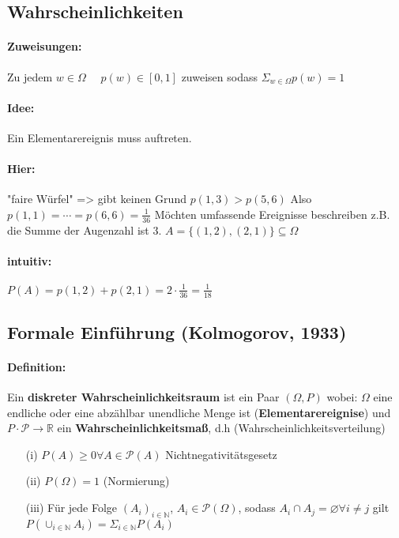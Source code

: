 \documentclass{article}
\begin{document}
\subsection*{Wahrscheinlichkeiten}
\paragraph*{Zuweisungen:} Zu jedem \(w \in \Omega \quad\) \(p(w) \in [0, 1]\) zuweisen sodass \(\Sigma_{w \in \Omega} p(w) = 1\)
\paragraph*{Idee:} Ein Elementarereignis muss auftreten.
\paragraph*{Hier:} "faire Würfel" => gibt keinen Grund \(p(1,3) > p(5,6)\) 
Also \(p(1,1) = \cdots = p(6,6) = \frac{1}{36}\)
Möchten umfassende Ereignisse beschreiben z.B. die Summe der Augenzahl ist 3.
\(A =\{(1,2), (2,1)\} \subseteq \Omega\)
\paragraph*{intuitiv:} \(P(A) = p(1,2) + p(2,1) = 2 \cdot \frac{1}{36} = \frac{1}{18}\)

\subsection*{Formale Einführung (Kolmogorov, 1933)}
\paragraph*{Definition:} Ein \textbf{diskreter Wahrscheinlichkeitsraum} ist ein Paar \((\Omega, P)\) wobei: \(\Omega\) eine endliche oder eine abzählbar unendliche Menge ist (\textbf{Elementarereignise}) und \(P \cdot \mathcal{P} \rightarrow\mathbb{R}\) ein \textbf{Wahrscheinlichkeitsmaß}, d.h (Wahrscheinlichkeitsverteilung)
\begin{itemize}
    \item [(i)] \(P(A) \geq 0 \forall A \in \mathcal{P}(A)\) Nichtnegativitätsgesetz
    \item [(ii)] \(P(\Omega) = 1\) (Normierung)
    \item  [(iii)] Für jede Folge \((A_i)_{i \in \mathbb{N}}\), \(A_i \in \mathcal{P}(\Omega)\), sodass \(A_i \cap A_j = \varnothing \forall i \not = j\) gilt \(P(\cup_{i \in \mathbb{N}} A_i) = \Sigma_{i \in \mathbb{N}} P(A_i)\)
\end{itemize}
\end{document}
